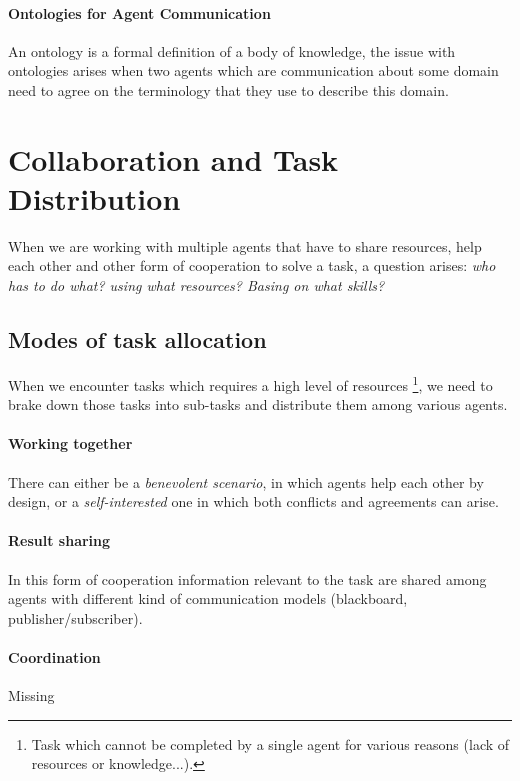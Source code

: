 \documentclass[10pt,a4paper]{article}
\begin{document}
\paragraph{Ontologies for Agent Communication}
An ontology is a formal definition of a body of knowledge, the issue with ontologies arises when two agents which are communication about some domain need to agree on the terminology that they use to describe this domain.\\

\newpage







\section{Collaboration and Task Distribution}
When we are working with multiple agents that have to share resources, help each other and other form of cooperation to solve a task, a question arises:
\textit{who has to do what? using what resources? Basing on what skills?}

\subsection{Modes of task allocation}
When we encounter tasks which requires a high level of resources \footnote{Task which cannot be completed by a single agent for various reasons (lack of resources or knowledge...).}, we need to brake down those tasks into sub-tasks and distribute them among various agents.\\

\paragraph{Working together } 
There can either be a \textit{benevolent scenario}, in which agents help each other by design, or a \textit{self-interested} one in which both conflicts and agreements can arise.

\paragraph{Result sharing} In this form of cooperation information relevant to the task are shared among agents with different kind of communication models (blackboard, publisher/subscriber).

\paragraph{Coordination} Missing
\end{document}
